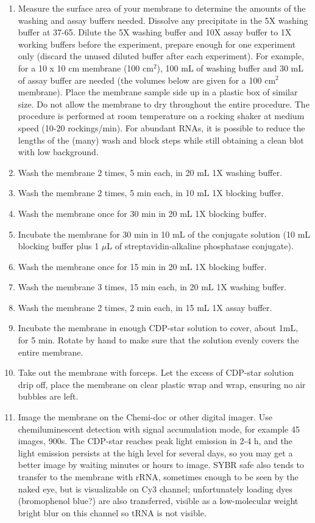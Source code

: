 \documentclass{article}
\newcommand{\mul}{\ensuremath{\mu}L\xspace}
\newcommand{\degC}{\celsius\xspace}
\begin{document}
\begin{enumerate}[resume]
  \item Measure the surface area of your membrane to determine the amounts of the washing and assay buffers needed. Dissolve any precipitate in the 5X washing buffer at 37-65\degC. Dilute the 5X washing buffer and 10X assay buffer to 1X working buffers before the experiment, prepare enough for one experiment only (discard the unused diluted buffer after each experiment). For example, for a 10 x 10 cm membrane (100 cm$^2$), 100 mL of washing buffer and 30 mL of assay buffer are needed (the volumes below are given for a 100 cm$^2$ membrane). Place the membrane sample side up in a plastic box of similar size. Do not allow the membrane to dry throughout the entire procedure. The procedure is performed at room temperature on a rocking shaker at medium speed (10-20 rockings/min). For abundant RNAs, it is possible to reduce the lengths of the (many) wash and block steps while still obtaining a clean blot with low background.
\item Wash the membrane 2 times, 5 min each, in 20 mL 1X washing buffer. 
\item Wash the membrane 2 times, 5 min each, in 10 mL 1X blocking buffer.
\item Wash the membrane once for 30 min in 20 mL 1X blocking buffer. 
\item Incubate the membrane for 30 min in 10 mL of the conjugate solution (10 mL
blocking buffer plus 1 \mul of streptavidin-alkaline phosphatase conjugate).   
\item Wash the membrane once for 15 min in 20 mL 1X blocking buffer. 
\item Wash the membrane 3 times, 15 min each, in 20 mL 1X washing buffer. 
\item Wash the membrane 2 times, 2 min each, in 15 mL 1X assay buffer. 
\item Incubate the membrane in enough CDP-star solution to cover, about 1mL, for 5 min. Rotate by hand to make sure that the solution evenly covers the entire membrane. 
\item Take out the membrane with forceps. Let the excess of CDP-star solution drip off, place the membrane on clear plastic wrap and wrap, ensuring no air bubbles are left.
\item Image the membrane on the Chemi-doc or other digital imager. Use chemiluminescent detection with signal accumulation mode, for example 45 images, 900s.
The CDP-star reaches peak light emission in 2-4 h, and the light emission persists at the high level for several days, so you may get a better image by waiting minutes or hours to image. SYBR safe also tends to transfer to the membrane with rRNA, sometimes enough to be seen by the naked eye, but is visualizable on Cy3 channel; unfortunately loading dyes (bromophenol blue?) are also transferred, visible as a low-molecular weight bright blur on this channel so tRNA is not visible. 
\end{enumerate}
\end{document}
